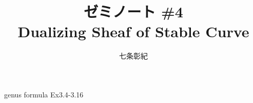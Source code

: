 \documentclass[a4paper]{jsarticle}
\begin{document}
\title{ゼミノート \#4 \\ Dualizing Sheaf of Stable Curve}
\author{七条彰紀}
\maketitle

genus formula
Ex3.4-3.16



\end{document}
